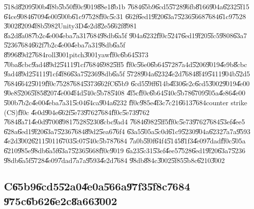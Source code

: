 \U{518d}\U{8209}\U{500b}\U{4f8b}\U{5b50}\U{ff0c}\U{9019}\U{88e1}\U{8b1b}%
\U{7684}\U{65b9}\U{6cd5}\U{5728}\U{96fb}\U{8166}\U{904a}\U{6232}\U{5f15}%
\U{64ce}\U{9084}\U{6709}\U{4e00}\U{500b}\U{61c9}\U{7528}\U{ff0c}\U{5c31}%
\U{662f}\U{6ed1}\U{9f20}\U{63a7}\U{5236}\U{5668}\U{7684}\U{61c9}\U{7528}%
\U{3002}\U{8209}\U{4f8b}\U{5982}Unity3D\U{4e2d}\U{82e5}\U{662f}\U{8981}%
\U{8a2d}\U{8a08}\U{7b2c}\U{4e00}\U{4eba}\U{7a31}\U{7684}\U{98db}\U{6a5f}%
\U{904a}\U{6232}\U{ff0c}\U{5247}\U{6ed1}\U{9f20}\U{5fc5}\U{9808}\U{63a7}%
\U{5236}\U{7684}\U{662f}\U{7b2c}\U{4e00}\U{4eba}\U{7a31}\U{98db}\U{6a5f}%
\U{8996}\U{89d2}\U{7684}roll\U{3001}pitch\U{3001}yaw\U{ff0c}\U{6b64}\U{5373}%
\U{70ba}\U{8cbc}\U{9ad4}\U{89d2}\U{5411}\U{91cf}\U{7684}\U{6982}\U{5ff5}%
\U{ff0c}\U{56e0}\U{6b64}\U{5728}\U{7a4d}\U{5206}\U{9019}\U{4e9b}\U{8cbc}%
\U{9ad4}\U{89d2}\U{5411}\U{91cf}\U{4f86}\U{63a7}\U{5236}\U{98db}\U{6a5f}%
\U{5728}\U{904a}\U{6232}\U{4e2d}\U{7684}\U{8f49}\U{5411}\U{904b}\U{52d5}%
\U{7684}\U{6642}\U{5019}\U{ff0c}\U{7528}\U{7684}\U{5373}\U{662f}C\U{65b9}%
\U{6cd5}\U{59ff}\U{614b}\U{4f30}\U{6e2c}\U{6cd5}\U{3002}\U{9019}\U{4e00}%
\U{90e8}\U{5206}\U{5f85}\U{8207}\U{4e00}\U{4f4d}\U{540c}\U{5b78}\U{5408}%
\U{4f5c}\U{ff0c}\U{6b64}\U{540c}\U{5b78}\U{6709}\U{505a}\U{4e86}\U{4e00}%
\U{500b}\U{7b2c}\U{4e00}\U{4eba}\U{7a31}\U{5c04}\U{64ca}\U{904a}\U{6232}%
\U{ff0c}\U{985e}\U{4f3c}\U{7c21}\U{6613}\U{7684}counter strike (CS)\U{ff0c}%
\U{4e0d}\U{904e}\U{662f}\U{5e73}\U{9762}\U{7684}\U{ff0c}\U{5e73}\U{9762}%
\U{7684}\U{8a71}\U{4e0d}\U{9700}\U{8981}\U{7528}\U{5230}\U{8cbc}\U{9ad4}%
\U{7684}\U{6982}\U{5ff5}\U{ff0c}\U{5e73}\U{9762}\U{7684}\U{53ef}\U{4ee5}%
\U{628a}\U{6ed1}\U{9f20}\U{63a7}\U{5236}\U{7684}\U{89d2}\U{5ea6}\U{76f4}%
\U{63a5}\U{505a}\U{5c0d}\U{61c9}\U{5230}\U{904a}\U{6232}\U{7a7a}\U{9593}%
\U{4e2d}\U{3002}\U{6211}\U{5011}\U{6703}\U{5c07}\U{540c}\U{5b78}\U{7684}%
\U{7a0b}\U{5f0f}\U{64f4}\U{5145}\U{81f3}\U{4e09}\U{7dad}\U{ff0c}\U{505a}%
\U{6210}\U{985e}\U{98db}\U{6a5f}\U{63a7}\U{5236}\U{5668}\U{ff0c}\U{9019}%
\U{6a23}\U{5c31}\U{53ef}\U{4ee5}\U{7528}\U{6ed1}\U{9f20}\U{63a7}\U{5236}%
\U{98db}\U{6a5f}\U{5728}\U{4e09}\U{7dad}\U{7a7a}\U{9593}\U{4e2d}\U{7684}%
\U{98db}\U{884c}\U{3002}\U{5f85}\U{5b8c}\U{6210}\U{3002}

\clearpage%

\subsection{C\U{65b9}\U{6cd5}\U{52a0}\U{4e0a}\U{566a}\U{97f3}\U{5f8c}\U{7684}%
\U{975c}\U{6b62}\U{6e2c}\U{8a66}\U{3002}}

